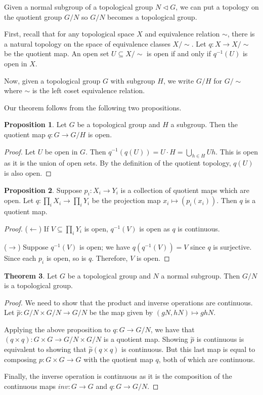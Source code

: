 \documentclass[12pt, a4paper]{article}
\theoremstyle{definition}
\newtheorem{theorem}{Theorem}[section]
\newtheorem{prop}[theorem]{Proposition}
\begin{document}
Given a normal subgroup of a topological group $N \triangleleft G$, we can put a topology on the quotient group $G/N$ so $G/N$ becomes a topological group.

First, recall that for any topological space $X$ and equivalence relation $\sim$, there is a natural topology on the space of equivalence classes $X / \sim$. Let $q : X \to X / \sim$ be the quotient map. An open set $ U \subseteq X / \sim$ is open if and only if $q^{-1}(U)$ is open in $X$.

Now, given a topological group $G$ with subgroup $H$, we write $G/H$ for $G / \sim$ where $\sim$ is the left coset equivalence relation.

Our theorem follows from the following two propositions.

\begin{prop}
Let $G$ be a topological group and $H$ a subgroup. Then the quotient map $q : G \to G/H$ is open.
\end{prop}
\begin{proof}
Let $U$ be open in $G$. Then $q^{-1}(q(U)) = U \cdot H = \bigcup_{h \in H} Uh$. This is open as it is the union of open sets. By the definition of the quotient topology, $q(U)$ is also open.
\end{proof}

\begin{prop}
Suppose $p_i : X_i \to Y_i$ is a collection of quotient maps which are open. Let $q : \prod_i X_i \to \prod_i Y_i$ be the projection map $x_i \mapsto (p_i(x_i))$. Then $q$ is a quotient map.
\end{prop}
\begin{proof}
($\leftarrow$) If $V\subseteq \prod_i Y_i$ is open, $q^{-1}(V)$ is open as $q$ is continuous.

($\rightarrow$) Suppose $q^{-1}(V)$ is open; we have $q(q^{-1}(V)) = V$ since $q$ is surjective. Since each $p_i$ is open, so is $q$. Therefore, $V$ is open.
\end{proof}

\begin{theorem}
Let $G$ be a topological group and $N$ a normal subgroup. Then $G / N$ is a topological group.
\end{theorem}
\begin{proof}
We need to show that the product and inverse operations are continuous. Let $\overset{\sim}{p}: G/N \times G/N \to G/N$ be the map given by $(gN,hN) \mapsto ghN$.

Applying the above proposition to $q : G \to G/N$, we have that $(q \times q): G \times G \to G/N \times G/N$ is a quotient map. Showing $\overset{\sim}{p}$ is continuous is equivalent to showing that $\overset{\sim}{p} (q \times q)$ is continuous. But this last map is equal to composing $p : G \times G \to G$ with the quotient map $q$, both of which are continuous.

Finally, the inverse operation is continuous as it is the composition of the continuous maps $inv : G \to G$ and $q : G \to G/N$.
\end{proof}
\end{document}

